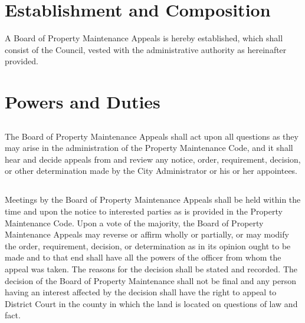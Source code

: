 \setcounter{section}{159}
\section{Establishment and Composition}
A Board of Property Maintenance Appeals is hereby established, which shall consist of the Council, vested with the administrative authority as hereinafter provided.

\section{Powers and Duties}
\subsection{}
The Board of Property Maintenance Appeals shall act upon all questions as they may arise in the administration of the Property Maintenance Code, and it shall hear and decide appeals from and review any notice, order, requirement, decision, or other determination made by the City Administrator or his or her appointees.
\subsection{}
Meetings by the Board of Property Maintenance Appeals shall be held within the time and upon the notice to interested parties as is provided in the Property Maintenance Code.  Upon a vote of the majority, the Board of Property Maintenance Appeals may reverse or affirm wholly or partially, or may modify the order, requirement, decision, or determination as in its opinion ought to be made and to that end shall have all the powers of the officer from whom the appeal was taken. The reasons for the decision shall be stated and recorded.  The decision of the Board of Property Maintenance shall not be final and any person having an interest affected by the decision shall have the right to appeal to District Court in the county in which the land is located on questions of law and fact.

